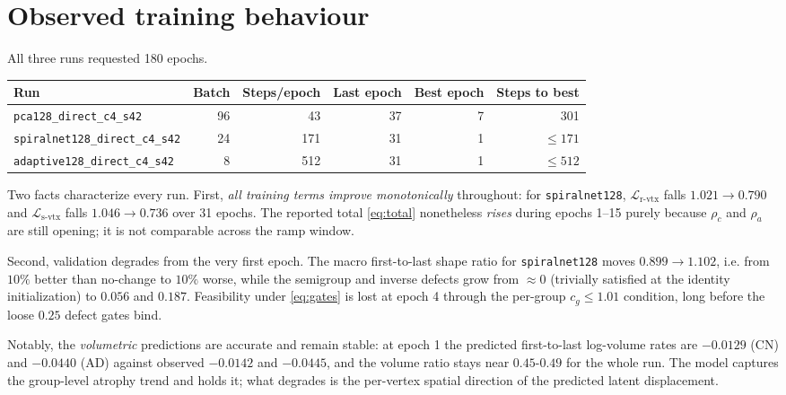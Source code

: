 \documentclass[11pt]{article}
\newcommand{\Loss}{\mathcal{L}}
\begin{document}
\section{Observed training behaviour}

All three runs requested 180 epochs.

\begin{center}
\begin{tabular}{lrrrrr}
\toprule
Run & Batch & Steps/epoch & Last epoch & Best epoch & Steps to best \\
\midrule
\texttt{pca128\_direct\_c4\_s42}       & 96 &  43 & 37 & 7 & 301 \\
\texttt{spiralnet128\_direct\_c4\_s42} & 24 & 171 & 31 & 1 & $\le 171$ \\
\texttt{adaptive128\_direct\_c4\_s42}  &  8 & 512 & 31 & 1 & $\le 512$ \\
\bottomrule
\end{tabular}
\end{center}

Two facts characterize every run. First, \emph{all training terms improve monotonically}
throughout: for \texttt{spiralnet128}, $\Loss_{\mathrm{r\text{-}vtx}}$ falls
$1.021 \to 0.790$ and $\Loss_{\mathrm{s\text{-}vtx}}$ falls $1.046 \to 0.736$ over 31
epochs. The reported total \eqref{eq:total} nonetheless \emph{rises} during epochs 1--15
purely because $\rho_c$ and $\rho_a$ are still opening; it is not comparable across the ramp
window.

Second, validation degrades from the very first epoch. The macro first-to-last shape ratio
for \texttt{spiralnet128} moves $0.899 \to 1.102$, i.e. from $10\%$ better than no-change to
$10\%$ worse, while the semigroup and inverse defects grow from $\approx 0$ (trivially
satisfied at the identity initialization) to $0.056$ and $0.187$. Feasibility under
\eqref{eq:gates} is lost at epoch 4 through the per-group $c_g \le 1.01$ condition, long
before the loose $0.25$ defect gates bind.

Notably, the \emph{volumetric} predictions are accurate and remain stable: at epoch 1 the
predicted first-to-last log-volume rates are $-0.0129$ (CN) and $-0.0440$ (AD) against
observed $-0.0142$ and $-0.0445$, and the volume ratio stays near $0.45$-$0.49$ for the
whole run. The model captures the group-level atrophy trend and holds it; what degrades is
the per-vertex spatial direction of the predicted latent displacement.
\end{document}
